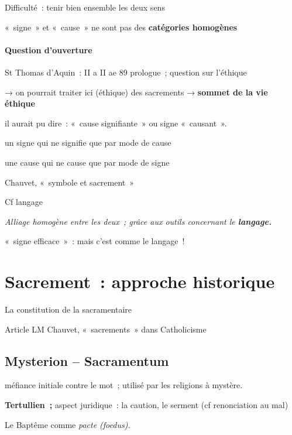 Difficulté~: tenir bien ensemble les deux sens

«~signe~» et «~cause~» ne sont pas des \textbf{catégories homogènes}


\paragraph{Question d'ouverture}

St Thomas d'Aquin~: II a II ae 89 prologue~; question sur l'éthique

→ on pourrait traiter ici (éthique) des sacrements → \textbf{sommet de
la vie éthique}

il aurait pu dire~: «~cause signifiante~» ou signe «~causant~».

un signe qui ne signifie que par mode de cause

une cause qui ne cause que par mode de signe

Chauvet, «~symbole et sacrement~»

Cf langage

\emph{Alliage homogène entre les deux~; grâce aux outils concernant le
\textbf{langage. }}

«~signe efficace~»~: mais c'est comme le langage~!

\section{Sacrement~: approche historique}

 
La constitution de la sacramentaire

Article LM Chauvet, «~sacrements~» dans Catholicisme

\hypertarget{mysterion-sacramentum}{%
\subsection{Mysterion -- Sacramentum}\label{mysterion-sacramentum}}

méfiance initiale contre le mot~; utilisé par les religions à mystère.

\textbf{Tertullien~;} aspect juridique~: la caution, le serment (cf
renonciation au mal)

Le Baptême comme \emph{pacte (foedus).}

